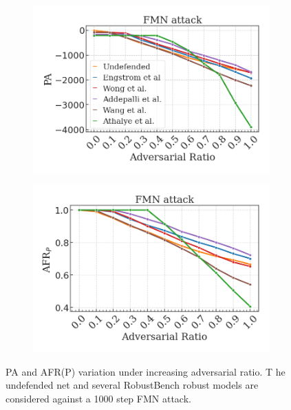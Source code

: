 \begin{figure}[H]
    \centering
    \begin{subfigure}[b]{0.45\textwidth}
        \centering
        \includegraphics[width=\textwidth]{img/results_discussion/adversarial/FMN_logPA.png}
    \end{subfigure}
    \begin{subfigure}[b]{0.45\textwidth}
        \centering
        \includegraphics[width=\textwidth]{img/results_discussion/adversarial/FMN_1000_AFR_pred.png}
    \end{subfigure}

    \caption{PA and AFR(P) variation under increasing adversarial ratio. T
    he undefended net and several RobustBench robust models are considered 
    against a 1000 step FMN attack.}
    \label{fig:appendix_adversarial_afrpred_fmn}
\end{figure}

